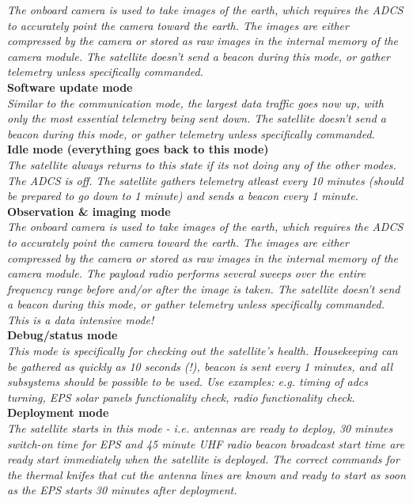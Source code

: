\documentclass[english,12pt,a4paper,pdftex,elec,utf8]{aaltothesis}
\begin{document}
\textit{The onboard camera is used to take images of the earth, which requires the ADCS to accurately point the camera toward the earth. The images are either compressed by the camera or stored as raw images in the internal memory of the camera module. The satellite doesn't send a beacon during this mode, or gather telemetry unless specifically commanded.}\\
\textbf{Software update mode}\\
\textit{Similar to the communication mode, the largest data traffic goes now up, with only the most essential telemetry being sent down. The satellite doesn't send a beacon during this mode, or gather telemetry unless specifically commanded.}\\
\textbf{Idle mode (everything goes back to this mode)}\\
\textit{The satellite always returns to this state if its not doing any of the other modes. The ADCS is off. The satellite gathers telemetry atleast every 10 minutes (should be prepared to go down to 1 minute) and sends a beacon every 1 minute.}\\
\textbf{Observation \& imaging mode}\\
\textit{The onboard camera is used to take images of the earth, which requires the ADCS to accurately point the camera toward the earth. The images are either compressed by the camera or stored as raw images in the internal memory of the camera module. The payload radio performs several sweeps over the entire frequency range before and/or after the image is taken. The satellite doesn't send a beacon during this mode, or gather telemetry unless specifically commanded. This is a data intensive mode!}\\
\textbf{Debug/status mode}\\
\textit{This mode is specifically for checking out the satellite's health. Housekeeping can be gathered as quickly as 10 seconds (!), beacon is sent every 1 minutes, and all subsystems should be possible to be used. Use examples: e.g. timing of adcs turning, EPS solar panels functionality check, radio functionality check.}\\
\textbf{Deployment mode}\\
\textit{The satellite starts in this mode - i.e. antennas are ready to deploy, 30 minutes switch-on time for EPS and 45 minute UHF radio beacon broadcast start time are ready start immediately when the satellite is deployed. The correct commands for the thermal knifes that cut the antenna lines are known and ready to start as soon as the EPS starts 30 minutes after deployment.}\par
\end{document}
